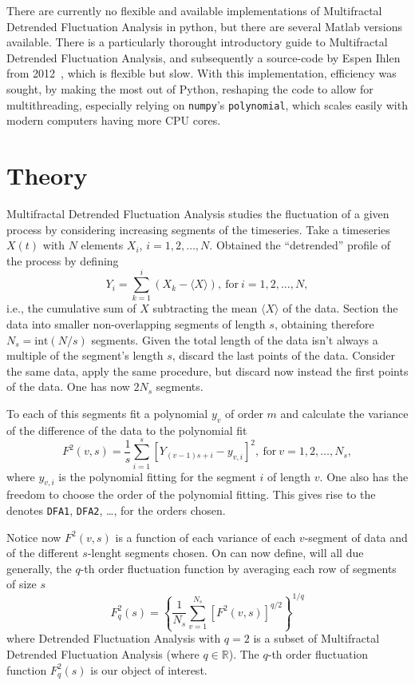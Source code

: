 \documentclass[pre, a4paper, aps, floatfix, superscriptaddress, onecolumn, notitlepage, longbibliography]{revtex4-1} %
\begin{document}
There are currently no flexible and available implementations of Multifractal Detrended Fluctuation Analysis in python, but there are several Matlab versions available.
There is a particularly thorought introductory guide to Multifractal Detrended Fluctuation Analysis, and subsequently a source-code by Espen Ihlen from 2012~\cite{Ihlen2012}, which is flexible but slow.
With this implementation, efficiency was sought, by making the most out of Python, reshaping the code to allow for multithreading, especially relying on \texttt{numpy}'s \texttt{polynomial}, which scales easily with modern computers having more CPU cores.

\section*{Theory}
Multifractal Detrended Fluctuation Analysis studies the fluctuation of a given process by considering increasing segments of the timeseries.
Take a timeseries $X(t)$ with $N$ elements $X_i$, $i=1,2, \dots, N$.
Obtained the ``detrended'' profile of the process by defining
\begin{equation}
  Y_i = \sum_{k=1}^i \left ( X_k - \langle X \rangle \right),~\text{for}~i=1,2, \dots, N,\nonumber
\end{equation}
i.e., the cumulative sum of $X$ subtracting the mean $\langle X \rangle$ of the data.
Section the data into smaller non-overlapping segments of length $s$, obtaining therefore $N_s = \text{int}(N/s)$ segments.
Given the total length of the data isn't always a multiple of the segment's length $s$, discard the last points of the data.
Consider the same data, apply the same procedure, but discard now instead the first points of the data.
One has now $2N_s$ segments.

To each of this segments fit a polynomial $y_v$ of order $m$ and calculate the variance of the difference of the data to the polynomial fit
\begin{equation}
  F^2(v,s) = \frac{1}{s} \sum_{i=1}^s [Y_{(v-1)s + i} - y_{v,i}]^2, ~\text{for}~v=1,2, \dots, N_s,\nonumber
\end{equation}
where $y_{v,i}$ is the polynomial fitting for the segment $i$ of length $v$.
One also has the freedom to choose the order of the polynomial fitting.
This gives rise to the denotes \texttt{DFA1}, \texttt{DFA2}, \dots, for the orders chosen.

Notice now $F^2(v,s)$ is a function of each variance of each $v$-segment of data and of the different $s$-lenght segments chosen.
On can now define, will all due generally, the $q$-th order fluctuation function by averaging each row of segments of size $s$
\begin{equation}
  F_q^2(s) = \left\{\frac{1}{N_s} \sum_{v=1}^{N_s} [F^2(v,s)]^{q/2}\right\}^{1/q}\nonumber
\end{equation}
where Detrended Fluctuation Analysis with $q=2$ is a subset of Multifractal Detrended Fluctuation Analysis (where $q\in \mathbb{R}$).
The $q$-th order fluctuation function $F_q^2(s)$ is our object of interest.
\end{document}
